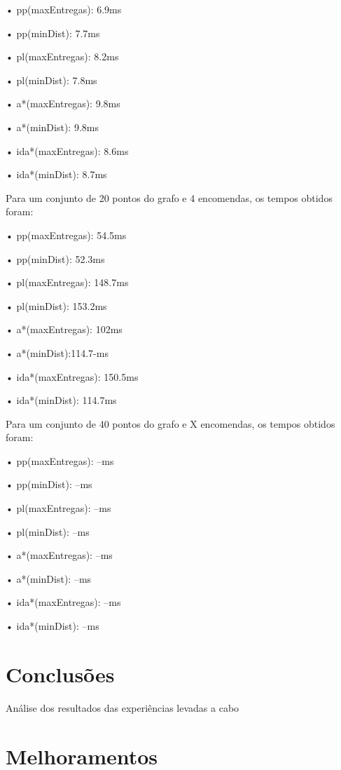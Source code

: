 \documentclass[a4paper]{article}
\begin{document}
	• pp(maxEntregas): 6.9ms

	• pp(minDist): 7.7ms

	• pl(maxEntregas): 8.2ms

	• pl(minDist): 7.8ms

	• a*(maxEntregas): 9.8ms

	• a*(minDist): 9.8ms

	• ida*(maxEntregas): 8.6ms

	• ida*(minDist): 8.7ms
\newline

Para um conjunto de 20 pontos do grafo e 4 encomendas, os tempos obtidos foram:

	• pp(maxEntregas): 54.5ms

	• pp(minDist): 52.3ms

	• pl(maxEntregas): 148.7ms

	• pl(minDist): 153.2ms

	• a*(maxEntregas): 102ms

	• a*(minDist):114.7-ms

	• ida*(maxEntregas): 150.5ms

	• ida*(minDist): 114.7ms
\newline

Para um conjunto de 40 pontos do grafo e X encomendas, os tempos obtidos foram:

	• pp(maxEntregas): --ms

	• pp(minDist): --ms

	• pl(maxEntregas): --ms

	• pl(minDist): --ms

	• a*(maxEntregas): --ms

	• a*(minDist): --ms

	• ida*(maxEntregas): --ms

	• ida*(minDist): --ms

\newpage

\section{Conclusões}

Análise dos resultados das experiências levadas a cabo

\newpage

\section{Melhoramentos}
\end{document}
